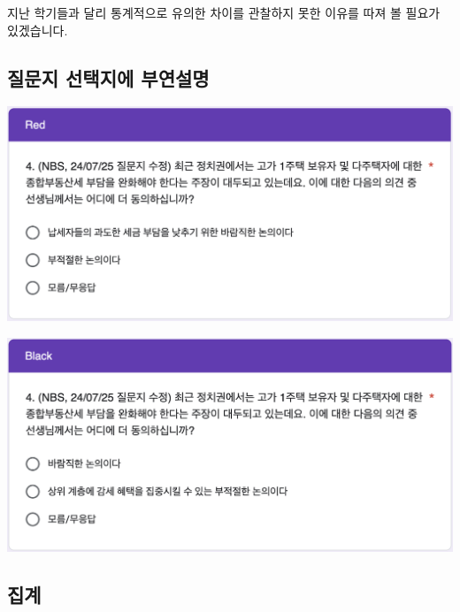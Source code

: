 \documentclass[
]{book}
\begin{document}
지난 학기들과 달리 통계적으로 유의한 차이를 관찰하지 못한 이유를 따져 볼 필요가 있겠습니다.

\subsection{질문지 선택지에 부연설명}\label{uxc9c8uxbb38uxc9c0-uxc120uxd0dduxc9c0uxc5d0-uxbd80uxc5f0uxc124uxba85}

\begin{flushleft}\includegraphics[width=0.67\linewidth]{./pics/Quiz240902_Q4_Red} \end{flushleft}

\begin{flushleft}\includegraphics[width=0.67\linewidth]{./pics/Quiz240902_Q4_Black} \end{flushleft}

\subsection{집계}\label{uxc9d1uxacc4}
\end{document}
